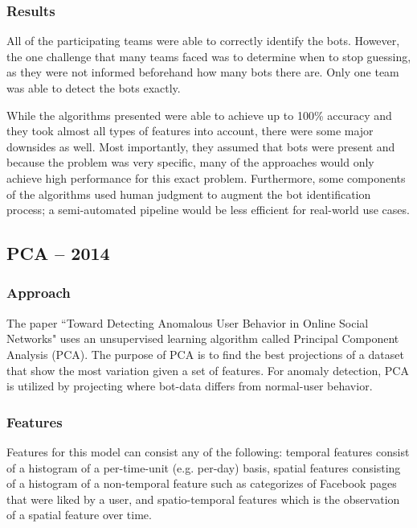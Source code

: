 \documentclass[11pt, oneside]{article}   	%
\begin{document}
\subsubsection*{Results}

\quad All of the participating teams were able to correctly identify the bots.
However, the one challenge that many teams faced was to determine when to stop guessing, as they were not informed beforehand how many bots there are.
Only one team was able to detect the bots exactly.

\quad While the algorithms presented were able to achieve up to 100\% accuracy and they took almost all types of features into account, there were some major downsides as well.
Most importantly, they assumed that bots were present and because the problem was very specific, many of the approaches would only achieve high performance for this exact problem.
Furthermore, some components of the algorithms used human judgment to augment the bot identification process; a semi-automated pipeline would be less efficient for real-world use cases.

\subsection*{PCA -- 2014}

\subsubsection*{Approach}

\quad The paper ``Toward Detecting Anomalous User Behavior in Online Social Networks" uses an unsupervised learning algorithm called Principal Component Analysis (PCA).
The purpose of PCA is to find the best projections of a dataset that show the most variation given a set of features.
For anomaly detection, PCA is utilized by projecting where bot-data differs from normal-user behavior.

\subsubsection*{Features}

\quad Features for this model can consist any of the following: temporal features consist of a histogram of a per-time-unit (e.g. per-day) basis, spatial features consisting of a histogram of a non-temporal feature such as categorizes of Facebook pages that were liked by a user, and spatio-temporal features which is the observation of a spatial feature over time.
\end{document}

